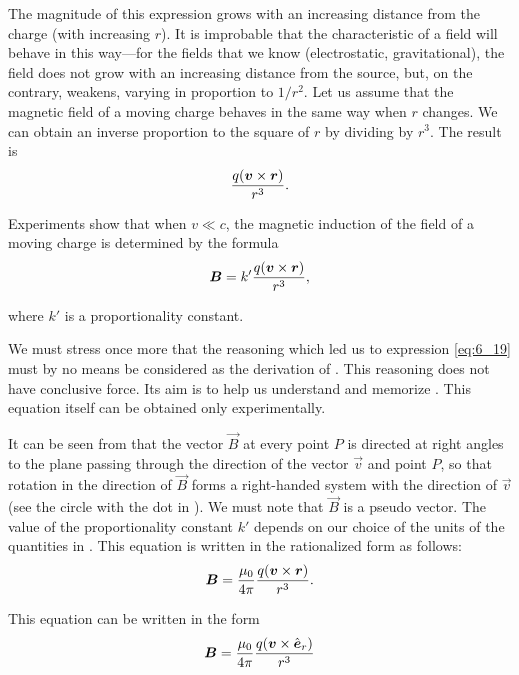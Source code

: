 \noindent
The magnitude of this expression grows with an increasing distance from the charge (with increasing $r$). It is improbable that the characteristic of a field will behave in this way---for the fields that we know (electrostatic, gravitational), the field does not grow with an increasing distance from the source, but, on the contrary, weakens, varying in proportion to $1/r^2$. Let us assume that the magnetic field of a moving charge behaves in the same way when $r$ changes. We can obtain an inverse proportion to the square of $r$ by dividing  by $r^3$. The result is
\begin{equation}\label{eq:6_19}
    \frac{q (\boldsymbol{v}\times\boldsymbol{r})}{r^3}.
\end{equation}

Experiments show that when $v\ll c$, the magnetic induction of the field of a moving charge is determined by the formula
\begin{equation}\label{eq:6_20}
    \boldsymbol{B} = k' \frac{q (\boldsymbol{v}\times\boldsymbol{r})}{r^3},
\end{equation}

\noindent
where $k'$ is a proportionality constant.

We must stress once more that the reasoning which led us to expression \eqref{eq:6_19} must by no means be considered as the derivation of . This reasoning does not have conclusive force. Its aim is to help us understand and memorize . This equation itself can be obtained only experimentally.

It can be seen from  that the vector $\vec{B}$ at every point $P$ is directed at right angles to the plane passing through the direction of the vector $\vec{v}$ and point $P$, so that rotation in the direction of $\vec{B}$ forms a right-handed system with the direction of $\vec{v}$ (see the circle with the dot in ). We must note that $\vec{B}$ is a pseudo vector. The value of the proportionality constant $k'$ depends on our choice of the units of the quantities in . This equation is written in the rationalized form as follows:
\begin{equation}\label{eq:6_21}
    \boldsymbol{B} = \frac{\mu_0}{4\pi} \frac{q (\boldsymbol{v}\times\boldsymbol{r})}{r^3}.
\end{equation}

\noindent
This equation can be written in the form
\begin{equation}\label{eq:6_22}
    \boldsymbol{B} = \frac{\mu_0}{4\pi} \frac{q (\boldsymbol{v}\times\hat{\boldsymbol{e}}_{r})}{r^3}
\end{equation}

